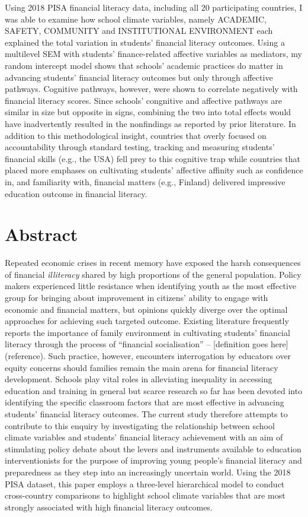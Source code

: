 \documentclass[a4paper,11pt,UKenglish,twoside,openright]{report}\usepackage[]{graphicx}\usepackage[]{color}
\begin{document}
Using 2018 PISA financial literacy data, including all 20 participating countries, I was able to examine how school climate variables, namely ACADEMIC, SAFETY, COMMUNITY and INSTITUTIONAL ENVIRONMENT each explained the total variation in students' financial literacy outcomes. Using a multilevel SEM with students' finance-related affective variables as mediators, my random intercept model shows that schools' academic practices do matter in advancing students' financial literacy outcomes but only through affective pathways. Cognitive pathways, however, were shown to correlate negatively with financial literacy scores. Since schools' congnitive and affective pathways are similar in size but opposite in signs, combining the two into total effects would have inadvertently resulted in the nonfindings as reported by prior literature. In addition to this methodological insight, countries that overly focused on accountability through standard testing, tracking and measuring students' financial skills (e.g., the USA) fell prey to this cognitive trap while countries that placed more emphases on cultivating students' affective affinity such as confidence in, and familiarity with, financial matters (e.g., Finland) delivered impressive education outcome in financial literacy.


\chapter*{Abstract}
\label{Ab.1}

Repeated economic crises in recent memory have exposed the harsh consequences of financial \emph{illiteracy} shared by high proportions of the general population. Policy makers experienced little resistance when identifying youth as the most effective group for bringing about improvement in citizens' ability to engage with economic and financial matters, but opinions quickly diverge over the optimal approaches for achieving such targeted outcome. Existing literature frequently reports the importance of family environment in cultivating students' financial literacy through the process of ``financial socialisation'' -- [definition goes here] (reference). Such practice, however, encounters interrogation by educators over equity concerns should families remain the main arena for financial literacy development. Schools play vital roles in alleviating inequality in accessing education and training in general but scarce research so far has been devoted into identifying the specific classroom factors that are most effective in advancing students' financial literacy outcomes. The current study therefore attempts to contribute to this enquiry by investigating the relationship between school climate variables and students' financial literacy achievement with an aim of stimulating policy debate about the levers and instruments available to education interventionists for the purpose of improving young people's financial literacy and preparedness as they step into an increasingly uncertain world. Using the 2018 PISA dataset, this paper employs a three-level hierarchical model to conduct cross-country comparisons to highlight school climate variables that are most strongly associated with high financial literacy outcomes.
\end{document}

